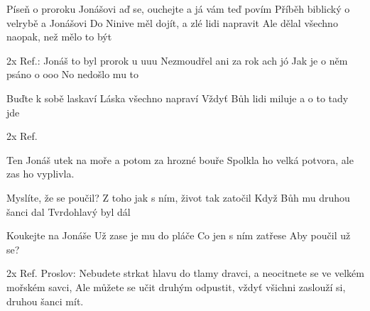 \begin{TEXT}{Píseň o proroku Jonášovi}
\SLOKA* {}aď se, ouchejte a já vám teď povím\NL
Příběh biblický o velrybě a Jonášovi\NL
Do Ninive měl dojít, a zlé lidi napravit\NL
Ale dělal všechno naopak, než mělo to být

\REFREN 2x Ref.: Jonáš to byl prorok u uuu\NL
Nezmoudřel ani za rok ach jó\NL
Jak je o něm psáno o ooo\NL
No nedošlo mu to

\SLOKA Buďte k sobě laskaví\NL
Láska všechno napraví\NL
Vždyť Bůh lidi miluje\NL
a o to tady jde

\REFREN 2x Ref.

\SLOKA Ten Jonáš utek na moře\NL
a potom za hrozné bouře\NL
Spolkla ho velká potvora,\NL    
ale zas ho vyplivla.

\SLOKA Myslíte, že se poučil?\NL
Z toho jak s ním, život tak zatočil\NL
Když Bůh mu druhou šanci dal\NL
Tvrdohlavý byl dál

\SLOKA Koukejte na Jonáše\NL
Už zase je mu do pláče\NL
Co jen s ním zatřese\NL
Aby poučil už se?

\REFREN 2x Ref.
\SLOKA* Proslov: Nebudete strkat hlavu do tlamy dravci,\NL
a neocitnete se ve velkém mořském savci,\NL
Ale můžete se učit druhým odpustit,\NL
vždyť všichni zaslouží si, druhou šanci mít.
\REFRENHRAJ
\end{TEXT}

